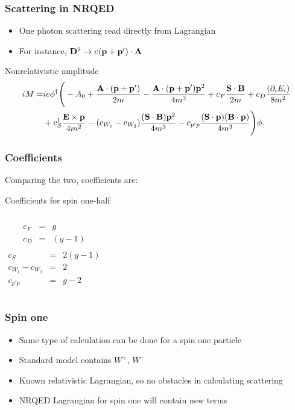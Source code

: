 \documentclass[11ppt]{beamer}
\newcommand{\beqa}{\begin{eqnarray*} }
\newcommand{\eeqa}{\end{eqnarray*} }
\newcommand{\beq}{\begin{equation*} }
\newcommand{\eeq}{\end{equation*} }
\begin{document}
\begin{frame}
\frametitle{Scattering in NRQED}
	\begin{itemize}
	  \item One photon scattering read directly from Lagrangian
	  \item For instance, $\mathbf{D}^2 \to  e (\mathbf{p} + \mathbf{p}') \cdot \mathbf{A} $ 
	\end{itemize}
	
	\begin{block}{Nonrelativistic amplitude}
	\footnotesize \beq 
\begin{split} 
	iM =&
		ie\phi^\dagger \Bigg(  -A_0 +  \frac{ \v{A} \cdot (\v{p} + \v{p}') }{2m} - \frac{  \v{A} \cdot (\v{p} + \v{p'}) \v{p}^2   }{4m^3} 
		+ c_F  \frac{\v{S} \cdot \v{B}} {2m}   	
		+ c_D \frac{ ( \partial_i E_i ) }{8m^2}	
		\\&	+ c^{1}_S \frac{  \v{E} \times \v{p} }{4m^2}
		- (c_{W_1} -c_{W_2}) \frac{   (\v{S} \cdot \v{B} ) \v{p}^2  }{4m^3}	
		-  c_{p'p} \frac{   (\v{S} \cdot \v{p}) (\v{B} \cdot \v{p})  }{4m^3} \Bigg )\phi .
\end{split}
\eeq \normalsize
	\end{block}
\end{frame}

\begin{frame}
\frametitle{Coefficients}

	Comparing the two, coefficients are:
	\begin{block}{Coefficients for spin one-half}
\begin{columns}[l]
\column{.5 in}
\beqa
	c_F &=& g \\
	c_D &=&	(g-1) 	\\
\eeqa
\column{1 in}
\beqa
	c_S &=& 2(g-1)	\\
	c_{W_1}- c_{W_2} &=& 2	\\
	c_{p'p}	&=&  g-2	
\eeqa
\end{columns}
	\end{block}

\end{frame}

\begin{frame}
\frametitle{Spin one}
	\begin{itemize}
	  \item Same type of calculation can be done for a spin one particle
	  \item Standard model contains $W^+$, $W^-$
	  \item Known relativistic Lagrangian, so no obstacles in calculating scattering
	  \item NRQED Lagrangian for spin one will contain new terms
	\end{itemize}

\end{frame}
\end{document}
